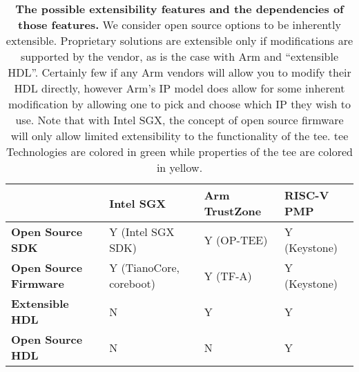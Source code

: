 \begin{table*}[p]
\begin{center}
\begin{tabular}{|L{3cm}|L{3.25cm}|L{3.25cm}|L{3.25cm}|}
\hline
\textbf{}  & \textbf{Intel SGX} & \textbf{Arm TrustZone} & \textbf{RISC-V PMP} \\ \hline
{}\textbf{Open Source SDK} & Y (Intel SGX SDK) & Y (OP-TEE)     & Y (Keystone)  \\ \hline
{}\textbf{Open Source Firmware} & Y (TianoCore, coreboot) & Y (TF-A)    & Y (Keystone)  \\ \hline
{}\textbf{Extensible HDL}    & N & Y     & Y  \\ \hline
{}\textbf{Open Source HDL} & N & N     & Y  \\ \hline
\end{tabular}
\end{center}
\caption[Extensibility Comparison]{\textbf{The possible extensibility features and the dependencies of those features.} We consider open source options to be inherently extensible. Proprietary solutions are extensible only if modifications are supported by the vendor, as is the case with Arm and ``extensible HDL''. Certainly few if any Arm vendors will allow you to modify their HDL directly, however Arm's IP model does allow for some inherent modification by allowing one to pick and choose which IP they wish to use. Note that with Intel SGX, the concept of open source firmware will only allow limited extensibility to the functionality of the \gls{tee}. \gls{tee} Technologies are colored in \colorbox{tbl-gre}{green} while properties of the \gls{tee} are colored in \colorbox{tbl-yel}{yellow}.}
\label{tab:ext-compare}
\end{table*}

